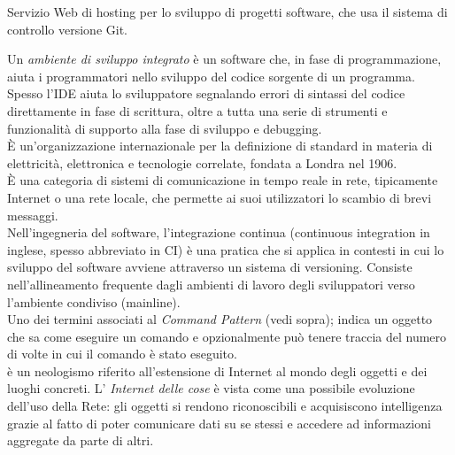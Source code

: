 \documentclass{scalatekids-article}
\begin{document}
 Servizio Web di hosting per lo sviluppo di progetti software, che usa il sistema di controllo  versione Git.
\\



 Un \textit{ambiente di sviluppo integrato} è un software che, in fase di programmazione, aiuta i programmatori nello sviluppo del codice sorgente di un programma. Spesso l'IDE aiuta lo sviluppatore segnalando errori di sintassi del codice direttamente in fase di scrittura, oltre a tutta una serie di strumenti e funzionalità di supporto alla fase di sviluppo e debugging.
\\

 È un'organizzazione internazionale per la definizione di standard in materia di elettricità, elettronica e tecnologie correlate, fondata a Londra nel 1906.
\\

 È una categoria di sistemi di comunicazione in tempo reale in rete, tipicamente Internet o una rete locale, che permette ai suoi utilizzatori lo scambio di brevi messaggi.
\\

 Nell'ingegneria del software, l'integrazione continua (continuous integration in inglese, spesso abbreviato in CI) è una pratica che si applica in contesti in cui lo sviluppo del software avviene attraverso un sistema di versioning. Consiste nell'allineamento frequente dagli ambienti di lavoro degli sviluppatori verso l'ambiente condiviso (mainline).
\\

 Uno dei termini associati al \textit{Command Pattern} (vedi sopra); indica un oggetto che sa come eseguire un comando e opzionalmente può tenere traccia del numero di volte in cui il comando è stato eseguito.
\\

 è un neologismo riferito all'estensione di Internet al mondo degli oggetti e dei luoghi concreti.
L' \textit{Internet delle cose} è vista come una possibile evoluzione dell'uso della Rete: gli oggetti si rendono riconoscibili e acquisiscono intelligenza grazie al fatto di poter comunicare dati su se stessi e accedere ad informazioni aggregate da parte di altri.
\\
\end{document}
